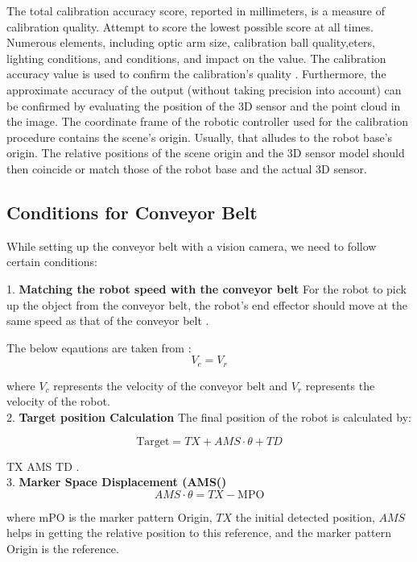 \documentclass[12pt]{article}
\begin{document}
 The total calibration accuracy score, reported in millimeters, is a measure of calibration quality.  Attempt to score the lowest possible score at all times.  Numerous elements, including optic arm size, calibration ball quality,eters, lighting conditions, and conditions, and impact on the value. The calibration accuracy value is used to confirm the calibration's quality . Furthermore, the approximate accuracy of the output (without taking precision into account) can be confirmed by evaluating the position of the 3D sensor and the point cloud in the image.
 The coordinate frame of the robotic controller used for the calibration procedure contains the scene's origin. Usually, that alludes to the robot base's origin.  The relative positions of the scene origin and the 3D sensor model should then coincide or match those of the robot base and the actual 3D sensor.

 \subsection{Conditions for Conveyor Belt}
While setting up the conveyor belt with a vision camera, we need to follow certain conditions:

1. \textbf{Matching the robot speed with the conveyor belt} For the robot to pick up the object from the conveyor belt, the robot's end effector should move at the same speed as that of the conveyor belt \cite{ref21}.

The below eqautions are taken from : \cite{ref21}
\[
V_c = V_r 
\]

where \( V_c \) represents the velocity of the conveyor belt and \( V_r \) represents the velocity of the robot\cite{ref21}.\\

2. \textbf{Target position Calculation} The final position of the robot is calculated by:

\[
\text{Target} = TX + AMS \cdot \theta + TD 
\]

 TX  AMS  TD \cite{ref21}.\\


3. \textbf{Marker Space Displacement (AMS()} \\

\[
AMS \cdot \theta = TX - \text{MPO}
\]

 where mPO is the marker pattern Origin, $TX$ the initial detected position, $AMS$ helps in getting the relative position to this reference, and the marker pattern Origin is the reference\cite{ref21}.
\end{document}
